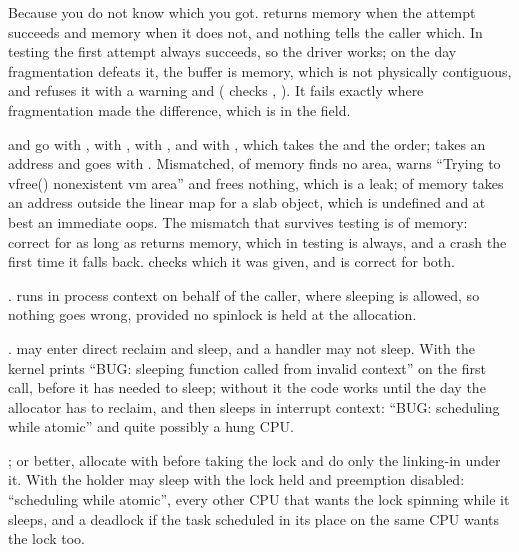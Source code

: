  Because you do not know which you got.  returns  memory when
the  attempt succeeds and  memory when it does not, and nothing tells the
caller which. In testing the first attempt always succeeds, so the driver works; on the day
fragmentation defeats it, the buffer is  memory, which is not physically contiguous,
and  refuses it with a warning and 
( checks , ).
It fails exactly where fragmentation made the difference, which is in the field.

  and  go with ,  with ,
 with , and  with , which takes the
 and the order;  takes an address and goes with
. Mismatched,  of  memory finds no 
area, warns ``Trying to vfree() nonexistent vm area'' and frees nothing, which is a leak;
 of  memory takes an address outside the linear map for a slab object,
which is undefined and at best an immediate oops. The mismatch that survives testing is 
of  memory: correct for as long as  returns  memory,
which in testing is always, and a crash the first time it falls back.  checks which it
was given, and is correct for both.


 .  runs in process context on behalf of the caller, where
sleeping is allowed, so nothing goes wrong, provided no spinlock is held at the allocation.

 .  may enter direct reclaim and sleep, and a handler may
not sleep. With  the kernel prints ``BUG: sleeping function called
from invalid context'' on the first call, before it has needed to sleep; without it the code works
until the day the allocator has to reclaim, and then sleeps in interrupt context: ``BUG: scheduling
while atomic'' and quite possibly a hung CPU.

 ; or better, allocate with  before taking the lock and
do only the linking-in under it. With  the holder may sleep with the lock held and
preemption disabled: ``scheduling while atomic'', every other CPU that wants the lock spinning while
it sleeps, and a deadlock if the task scheduled in its place on the same CPU wants the lock too.

